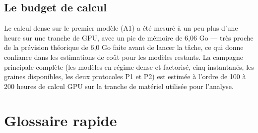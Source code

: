 \documentclass[11pt,a4paper]{article}
\begin{document}
\subsection{Le budget de calcul}

Le calcul dense sur le premier modèle (A1) a été mesuré à un peu plus d'une heure sur une tranche de
GPU, avec un pic de mémoire de 6,06 Go — très proche de la prévision théorique de 6,0 Go faite avant
de lancer la tâche, ce qui donne confiance dans les estimations de coût pour les modèles restants.
La campagne principale complète (les modèles en régime dense et factorisé, cinq instantanés, les
graines disponibles, les deux protocoles P1 et P2) est estimée à l'ordre de 100 à 200 heures de
calcul GPU sur la tranche de matériel utilisée pour l'analyse.

\section{Glossaire rapide}
\end{document}

